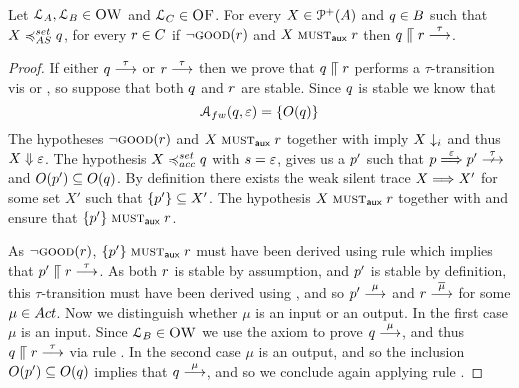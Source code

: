 \begin{lemma}%
  \label{lem:stability-Nbhvleqtwo}
  Let $\mathcal{L}_A, \mathcal{L}_B \in \textsc{OW}$ and $\mathcal{L}_C \in \textsc{OF}$.
  For every $X \in \mathcal{P}^{+}( A )$ and
  $q \in B $ such that
  $X \asleqset \serverB$, for every $r \in C$
  if $\lnot \textsc{good}(r)$ and $X \mathrel{\operatorname{\textsc{must}}_{\textsf{aux}}} r$
  then $q \mathrel{\llceil} r \mathrel{\overset{\tau}\longrightarrow}$.
\end{lemma}
\begin{proof}
  If either $q \mathrel{\overset{\tau}\longrightarrow}$ or $r \mathrel{\overset{\tau}\longrightarrow}$
  then we prove that $q \mathrel{\llceil} r$ performs
  a $\tau$-transition vis \stauserver or \stauclient, so suppose that both
  $q$ and $r$ are stable.
  Since $q$ is stable we know that
  $$
  \accht{q}{ \varepsilon } = \set{ O(q) }
  $$
  The hypotheses $\lnot \textsc{good}(r)$ and $ X \mathrel{\operatorname{\textsc{must}}_{\textsf{aux}}} r$ together with
   imply $X \downarrow_i$ and thus $X \mathrel{\Downarrow} \varepsilon$.
  The hypothesis $X \accleqset q$ with $s = \varepsilon$,
  gives us a $p'$ such that $\serverA \wt{\varepsilon} \serverA' \stable$
  and $O(p') \subseteq O(q)$.
  By definition there exists the weak silent trace
  $ X \mathrel{\overset{ } \Longrightarrow} X'$ for some set $X'$ such that $ \{  p'  \}
  \subseteq X' $.
  The hypothesis  $X \mathrel{\operatorname{\textsc{must}}_{\textsf{aux}}} r$ together with
   and  ensure that
  $\{ p' \} \mathrel{\operatorname{\textsc{must}}_{\textsf{aux}}} r$.

  As $\lnot \textsc{good}(r)$, $\{ p' \} \mathrel{\operatorname{\textsc{must}}_{\textsf{aux}}} r$
  must have been derived using rule \mstep which implies that $p' \mathrel{\llceil} r \mathrel{\overset{\tau}\longrightarrow}$.
  As both $r$ is stable by assumption, and $p'$ is stable
  by definition, this $\tau$-transition must have been
  derived using , and so %
    $p' \mathrel{\overset{\mu}\longrightarrow}$ and $r \mathrel{\overset{\overline{\mu}}\longrightarrow}$ for some $\mu \in \Act$.
  Now we distinguish whether $\mu$ is an input or an output.
  In the first case $\mu$ is an input. Since $\mathcal{L}_{B} \in
  \textsc{OW}$ we use the \boom axiom to prove $q \mathrel{\overset{ \mu }\longrightarrow}$, and thus
  $q  \mathrel{\llceil}  r \mathrel{\overset{ \tau }\longrightarrow}$ via rule \scom.
  In the second case $\mu$ is an output, and so the inclusion
  $O(p') \subseteq O(q)$ implies that $q
  \mathrel{\overset{ \mu }\longrightarrow}$, and so we conclude again applying rule \scom.
\end{proof}




